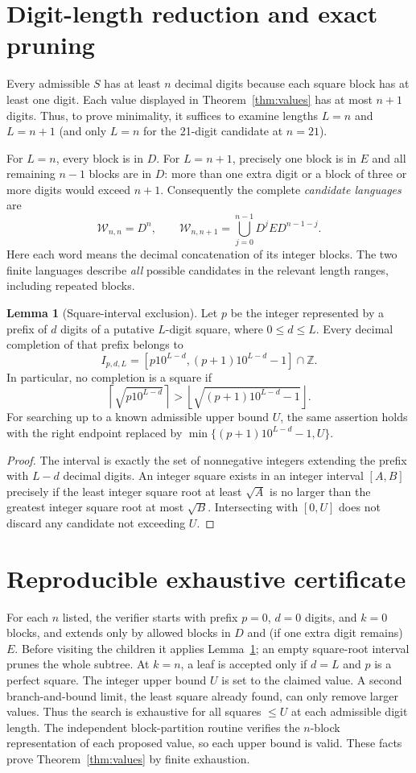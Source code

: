 \documentclass[10pt]{article}
\theoremstyle{definition}
\newtheorem{lemma}{Lemma}
\begin{document}
\section{Digit-length reduction and exact pruning}
Every admissible $S$ has at least $n$ decimal digits because each square
block has at least one digit. Each value displayed in
Theorem~\ref{thm:values} has at most $n+1$ digits. Thus, to prove
minimality, it suffices to examine lengths $L=n$ and $L=n+1$
(and only $L=n$ for the 21-digit candidate at $n=21$).

For $L=n$, every block is in $D$. For $L=n+1$, precisely one block
is in $E$ and all remaining $n-1$ blocks are in $D$: more than one
extra digit or a block of three or more digits would exceed $n+1$.
Consequently the complete \emph{candidate languages} are
\[
 \mathcal W_{n,n}=D^n,\qquad
 \mathcal W_{n,n+1}=\bigcup_{j=0}^{n-1}D^j E D^{n-1-j}.
\]
Here each word means the decimal concatenation of its integer blocks.
The two finite languages describe \emph{all} possible candidates in
the relevant length ranges, including repeated blocks.

\begin{lemma}[Square-interval exclusion]\label{lem:interval}
Let $p$ be the integer represented by a prefix of $d$ digits of a
putative $L$-digit square, where $0\leq d\leq L$. Every decimal
completion of that prefix belongs to
\[
 I_{p,d,L}=[p10^{L-d},(p+1)10^{L-d}-1]\cap\mathbb Z.
\]
In particular, no completion is a square if
\[
 \left\lceil\sqrt{p10^{L-d}}\right\rceil
 > \left\lfloor\sqrt{(p+1)10^{L-d}-1}\right\rfloor.
\]
For searching up to a known admissible upper bound $U$, the same
assertion holds with the right endpoint replaced by
$\min\{(p+1)10^{L-d}-1,U\}$.
\end{lemma}
\begin{proof}
The interval is exactly the set of nonnegative integers extending the
prefix with $L-d$ decimal digits. An integer square exists in an
integer interval $[A,B]$ precisely if the least integer square root
at least $\sqrt A$ is no larger than the greatest integer square root
at most $\sqrt B$. Intersecting with $[0,U]$ does not discard any
candidate not exceeding $U$.
\end{proof}

\section{Reproducible exhaustive certificate}
For each $n$ listed, the verifier starts with prefix $p=0$, $d=0$
digits, and $k=0$ blocks, and extends only by allowed blocks in
$D$ and (if one extra digit remains) $E$. Before visiting the
children it applies Lemma~\ref{lem:interval}; an empty square-root
interval prunes the whole subtree. At $k=n$, a leaf is accepted only
if $d=L$ and $p$ is a perfect square. The integer upper bound $U$ is
set to the claimed value. A second branch-and-bound limit, the least
square already found, can only remove larger values. Thus the search
is exhaustive for all squares $\leq U$ at each admissible digit length.
The independent block-partition routine verifies the $n$-block
representation of each proposed value, so each upper bound is valid.
These facts prove Theorem~\ref{thm:values} by finite exhaustion.
\end{document}
